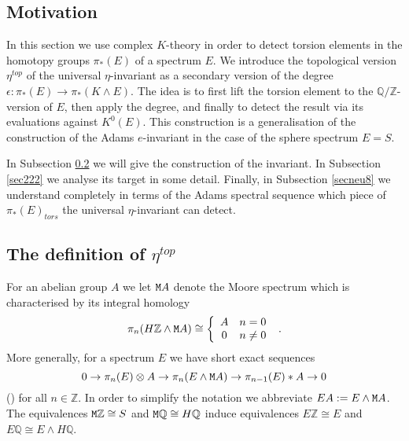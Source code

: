 \documentclass[12pt]{article}
\newcommand{\Z}{{\mathbb{Z}}}
\newcommand{\Q}{{\mathbb{Q}}}
\newcommand{\tM}{{\tt M}}
\begin{document}
%

%

%



\subsection{Motivation}

In this section we use complex $K$-theory in order to detect torsion elements in the homotopy groups $\pi_{*}(E)$ of a spectrum $E$. We introduce the topological version $\eta^{top}$ of the universal $\eta$-invariant  as a secondary version of the degree
$\epsilon:\pi_{*}(E)\to \pi_{*}(K\wedge E)$. The idea is to first lift
the torsion element to the $\Q/\Z$-version of $E$, then apply the degree, and finally to detect
the result via its evaluations against $K^{0}(E)$.  This construction is a generalisation of the 
construction of the Adams $e$-invariant in the case of the sphere spectrum $E=S$.

In Subsection \ref{sec141} we will give the construction of the invariant. In Subsection \ref{sec222} we
analyse its target in some detail. Finally, in Subsection \ref{secneu8} we understand completely in terms of the Adams spectral sequence which piece of
$\pi_{*}(E)_{tors}$ the universal $\eta$-invariant can detect.








 








\subsection{The definition of $\eta^{top}$}\label{sec141}






For an abelian group $A$ we let
 $\tM A$ denote the Moore spectrum 
which  is characterised by  its integral homology
$$\pi_{n}(H\Z\wedge \tM A)\cong \left\{\begin{array}{cc} 
A&n=0\\0&n\not=0\end{array}\right. \ .$$
More generally, for a spectrum $E$ we have short
exact sequences
\begin{equation}\label{torseq}0\to \pi_{n}(E)\otimes A\to \pi_{n}(E\wedge \tM A)\to \pi_{n-1}(E)*A\to 0\end{equation}
(\cite[(2.1)]{MR551009}) for all $n\in \Z$. In order to simplify the notation
  we abbreviate $EA:=E\wedge \tM A$. 
  The equivalences $\tM \Z\cong S$ and $\tM \Q\cong H\Q$ induce 
equivalences
$E\Z\cong E$ and $E\Q\cong E\wedge H\Q$. 
\end{document}
